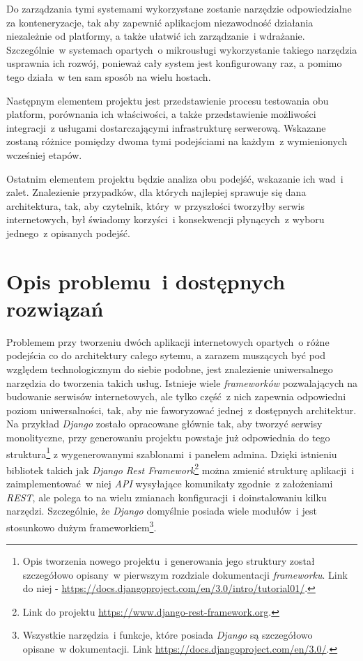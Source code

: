 Do zarządzania tymi systemami wykorzystane zostanie narzędzie odpowiedzialne za konteneryzacje, tak aby zapewnić aplikacjom niezawodność działania niezależnie od platformy, a także ułatwić ich zarządzanie~i wdrażanie. Szczególnie~w systemach opartych~o mikrousługi wykorzystanie takiego narzędzia usprawnia ich rozwój, ponieważ cały system jest konfigurowany raz, a pomimo tego działa~w ten sam sposób na wielu hostach.

Następnym elementem projektu jest przedstawienie procesu testowania obu platform, porównania ich właściwości, a także przedstawienie możliwości integracji~z usługami dostarczającymi infrastrukturę serwerową. Wskazane zostaną różnice pomiędzy dwoma tymi podejściami na każdym~z wymienionych wcześniej etapów.

Ostatnim elementem projektu będzie analiza obu podejść, wskazanie ich wad~i zalet. Znalezienie przypadków, dla których najlepiej sprawuje się dana architektura, tak, aby czytelnik, który~w przyszłości tworzyłby serwis internetowych, był świadomy korzyści~i konsekwencji płynących~z wyboru jednego~z opisanych podejść.

\section{Opis problemu~i dostępnych rozwiązań}
\label{sec:problemy}
Problemem przy tworzeniu dwóch aplikacji internetowych opartych~o różne podejścia co do architektury całego sytemu, a zarazem muszących być pod względem technologicznym do siebie podobne, jest znalezienie uniwersalnego narzędzia do tworzenia takich usług. Istnieje wiele \textit{frameworków} pozwalających na budowanie serwisów internetowych, ale tylko część~z nich zapewnia odpowiedni poziom uniwersalności, tak, aby nie faworyzować jednej~z dostępnych architektur. Na przykład \textit{Django} zostało opracowane głównie tak, aby tworzyć serwisy monolityczne, przy generowaniu projektu powstaje już odpowiednia do tego struktura\footnote{Opis tworzenia nowego projektu~i generowania jego struktury został szczegółowo opisany~w pierwszym rozdziale dokumentacji \textit{frameworku}. Link do niej - \url{https://docs.djangoproject.com/en/3.0/intro/tutorial01/}.} z wygenerowanymi szablonami~i panelem admina. Dzięki istnieniu bibliotek takich jak \textit{Django Rest Framework}\footnote{Link do projektu \url{https://www.django-rest-framework.org}.} można zmienić strukturę aplikacji~i zaimplementować~w niej \textit{API} wysyłające komunikaty zgodnie~z założeniami \textit{REST}, ale polega to na wielu zmianach konfiguracji~i doinstalowaniu kilku narzędzi. Szczególnie, że \textit{Django} domyślnie posiada wiele modułów~i jest stosunkowo dużym frameworkiem\footnote{Wszystkie narzędzia~i funkcje, które posiada \textit{Django} są szczegółowo opisane~w dokumentacji. Link \url{https://docs.djangoproject.com/en/3.0/}.}.

